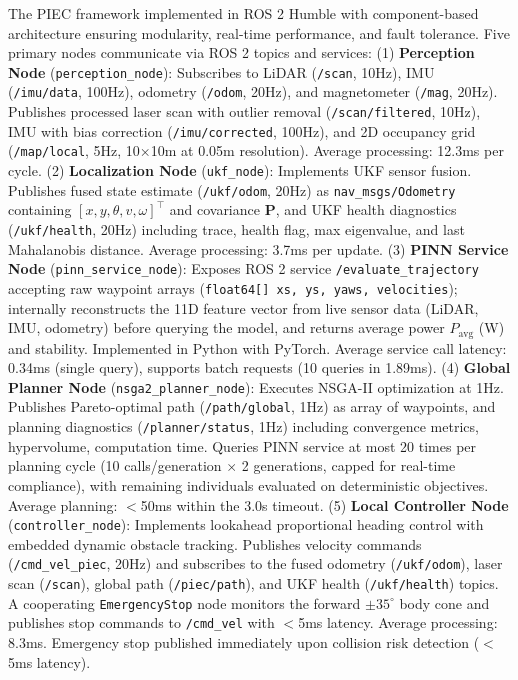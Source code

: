 \documentclass[pdflatex,sn-nature]{sn-jnl}%
\begin{document}
The PIEC framework implemented in ROS 2 Humble with component-based architecture ensuring modularity, real-time performance, and fault tolerance. Five primary nodes communicate via ROS 2 topics and services: (1) \textbf{Perception Node} (\texttt{perception\_node}): Subscribes to LiDAR (\texttt{/scan}, 10Hz), IMU (\texttt{/imu/data}, 100Hz), odometry (\texttt{/odom}, 20Hz), and magnetometer (\texttt{/mag}, 20Hz). Publishes processed laser scan with outlier removal (\texttt{/scan/filtered}, 10Hz), IMU with bias correction (\texttt{/imu/corrected}, 100Hz), and 2D occupancy grid (\texttt{/map/local}, 5Hz, 10×10m at 0.05m resolution). Average processing: 12.3ms per cycle. (2) \textbf{Localization Node} (\texttt{ukf\_node}): Implements UKF sensor fusion. Publishes fused state estimate (\texttt{/ukf/odom}, 20Hz) as \texttt{nav\_msgs/Odometry} containing $[x, y, \theta, v, \omega]^\top$ and covariance $\mathbf{P}$, and UKF health diagnostics (\texttt{/ukf/health}, 20Hz) including trace, health flag, max eigenvalue, and last Mahalanobis distance. Average processing: 3.7ms per update. (3) \textbf{PINN Service Node} (\texttt{pinn\_service\_node}): Exposes ROS 2 service \texttt{/evaluate\_trajectory} accepting raw waypoint arrays (\texttt{float64[] xs, ys, yaws, velocities}); internally reconstructs the 11D feature vector from live sensor data (LiDAR, IMU, odometry) before querying the model, and returns average power $P_{\text{avg}}$ (W) and stability. Implemented in Python with PyTorch. Average service call latency: 0.34ms (single query), supports batch requests (10 queries in 1.89ms). (4) \textbf{Global Planner Node} (\texttt{nsga2\_planner\_node}): Executes NSGA-II optimization at 1Hz. Publishes Pareto-optimal path (\texttt{/path/global}, 1Hz) as array of waypoints, and planning diagnostics (\texttt{/planner/status}, 1Hz) including convergence metrics, hypervolume, computation time. Queries PINN service at most 20 times per planning cycle (10 calls/generation $\times$ 2 generations, capped for real-time compliance), with remaining individuals evaluated on deterministic objectives. Average planning: $<$50ms within the 3.0s timeout. (5) \textbf{Local Controller Node} (\texttt{controller\_node}): Implements lookahead proportional heading control with embedded dynamic obstacle tracking. Publishes velocity commands (\texttt{/cmd\_vel\_piec}, 20Hz) and subscribes to the fused odometry (\texttt{/ukf/odom}), laser scan (\texttt{/scan}), global path (\texttt{/piec/path}), and UKF health (\texttt{/ukf/health}) topics. A cooperating \texttt{EmergencyStop} node monitors the forward $\pm 35^\circ$ body cone and publishes stop commands to \texttt{/cmd\_vel} with $<$5ms latency. Average processing: 8.3ms. Emergency stop published immediately upon collision risk detection ($<$5ms latency).
\end{document}
